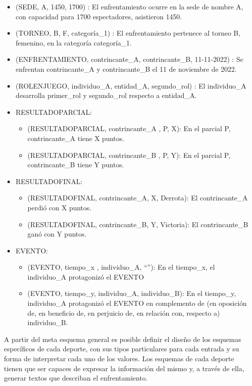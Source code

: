     \begin{itemize}
        \item (SEDE, A, 1450, 1700) : El enfrentamiento ocurre en la sede de nombre A, con capacidad para 1700 espectadores, asistieron 1450.
        \item (TORNEO, B, F, categoría\_1) : El enfrentamiento pertenece al torneo B, femenino, en la categoría categoría\_1.
        \item (ENFRENTAMIENTO, contrincante\_A, contrincante\_B, 11-11-2022) : Se enfrentan contrincante\_A y contrincante\_B el 11 de noviembre de 2022. 
        \item (ROLENJUEGO, individuo\_A, entidad\_A, segundo\_rol) : El individuo\_A desarrolla primer\_rol y segundo\_rol respecto a entidad\_A.
        \item RESULTADOPARCIAL:
            \begin{itemize}
                \item (RESULTADOPARCIAL, contrincante\_A , P, X): En el parcial P, contrincante\_A tiene X puntos.
                \item (RESULTADOPARCIAL, contrincante\_B , P, Y): En el parcial P, contrincante\_B tiene Y puntos.
            \end{itemize}
        \item RESULTADOFINAL:
            \begin{itemize}
                \item (RESULTADOFINAL, contrincante\_A, X, Derrota): El contrincante\_A perdió con X puntos.
                \item (RESULTADOFINAL, contrincante\_B, Y, Victoria): El contrincante\_B ganó con Y puntos.
            \end{itemize}
        \item EVENTO: 
            \begin{itemize}
                \item (EVENTO, tiempo\_x , individuo\_A, “”): En el tiempo\_x, el individuo\_A protagonizó el EVENTO
                \item (EVENTO, tiempo\_y, individuo\_A, individuo\_B): En el tiempo\_y, individuo\_A protagonizó el EVENTO en 
                complemento de (en oposición de, en beneficio de, en perjuicio de, en relación con, respecto a) individuo\_B. 
            \end{itemize}
    \end{itemize}

   A partir del meta esquema general es posible definir el diseño de los esquemas específicos de cada deporte, con sus tipos particulares para cada entrada y su forma de interpretar 
cada uno de los valores. Los esquemas de cada deporte tienen que ser capaces de expresar la información del mismo y, a través de ella, 
generar textos que describan el enfrentamiento. 

